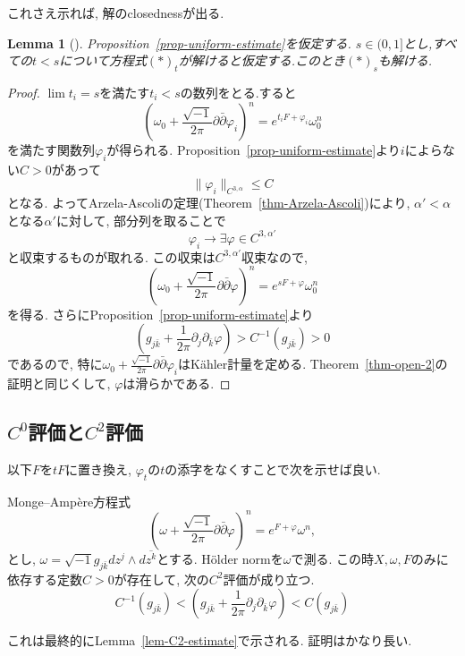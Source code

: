 \documentclass[dvipdfmx,a4paper,11pt]{article} %
\newtheorem{lem}[thm]{Lemma}
\theoremstyle{definition}
\theoremstyle{remark}
\numberwithin{equation}{section}
\begin{document}
これさえ示れば, 解のclosednessが出る. 

\begin{lem}
[{\cite[Lemma 3.5]{Sze14}}]
Proposition~\ref{prop-uniform-estimate}を仮定する.
$s\in(0,1]$とし,すべての$t<s$について方程式$(*)_t$が解けると仮定する.このとき$(*)_s$も解ける.
\end{lem}
\begin{proof}
$\lim t_i=s$を満たす$t_i<s$の数列をとる.すると
\[
\left(\omega_0+\frac{\sqrt{-1}}{2\pi}\partial\bar\partial\varphi_i\right)^n=e^{t_iF+\varphi_i}\omega_0^n
\]
を満たす関数列$\varphi_i$が得られる.
Proposition~\ref{prop-uniform-estimate}より$i$によらない$C>0$があって
\[
\lVert \varphi_i\rVert_{C^{3,\alpha}}
\leq C
\] 
となる. よってArzela-Ascoliの定理(Theorem~\ref{thm-Arzela-Ascoli})により,
$\alpha'<\alpha$となる$\alpha'$に対して, 部分列を取ることで
\[
\varphi_i
\to \exists \varphi \in C^{3,\alpha'}
\]
と収束するものが取れる. 
この収束は$C^{3,\alpha'}$収束なので,  
\[
\left(\omega_0+\frac{\sqrt{-1}}{2\pi}\partial\bar\partial\varphi\right)^n=e^{sF+\varphi}\omega_0^n
\]
を得る. 
さらにProposition~\ref{prop-uniform-estimate}より 
\[
\left(g_{j\bar k}+\frac{1}{2\pi}\partial_j\partial_{\bar k}\varphi \right)>C^{-1}(g_{j\bar k})>0
\]
であるので, 特に$\omega_0+\frac{\sqrt{-1}}{2\pi}\partial\bar\partial\varphi_i$はK\"ahler計量を定める. 
Theorem~\ref{thm-open-2}の証明と同じくして,  $\varphi$は滑らかである. 
\end{proof}

\subsection{$C^0$評価と$C^2$評価}
以下$F$を$tF$に置き換え, $\varphi_t$の$t$の添字をなくすことで次を示せば良い. 
\begin{tcolorbox}[mybox]
Monge--Amp\`ere方程式
\begin{equation}
\label{eq-MA-eq}
\left(\omega+\frac{\sqrt{-1}}{2\pi}\partial\bar\partial\varphi\right)^n=e^{F+\varphi}\omega^n,
\end{equation}
とし, $\omega = \sqrt{-1}g_{j\bar k}dz^j \wedge d \overline{z^k}$とする. H\"older normを$\omega$で測る.  
この時$X,\omega,F$のみに依存する定数$C>0$が存在して, 次の$C^2$評価が成り立つ. 
\[C^{-1}(g_{j\bar k})<(g_{j\bar k}+\frac{1}{2\pi}\partial_j\partial_{\bar k}\varphi)<C (g_{j\bar k})\]
\end{tcolorbox}
これは最終的にLemma~\ref{lem-C2-estimate}で示される. 証明はかなり長い. 
\end{document}
